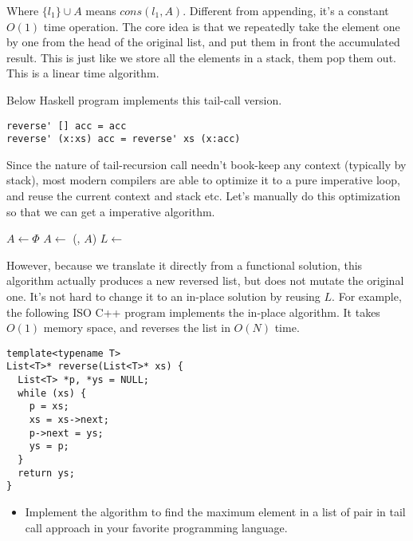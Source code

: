 \documentclass{article}
\begin{document}
Where $\{l_1\} \cup A$ means $cons(l_1, A)$. Different from appending, it's a constant $O(1)$ time operation. The core idea is
that we repeatedly take the element one by one from the head of the original list, and put them in front the accumulated
result. This is just like we store all the elements in a stack, them pop them out. This is a linear time algorithm.

Below Haskell program implements this tail-call version.

\begin{lstlisting}
reverse' [] acc = acc
reverse' (x:xs) acc = reverse' xs (x:acc)
\end{lstlisting}

Since the nature of tail-recursion call needn't book-keep any context (typically by stack), most modern compilers are
able to optimize it to a pure imperative loop, and reuse the current context and stack etc. Let's manually do this
optimization so that we can get a imperative algorithm.

\begin{algorithmic}
  \State $A \gets \Phi$
    \State $A \gets $ (, $A$)
    \State $L \gets$ 
  \EndWhile
\EndFunction
\end{algorithmic}

However, because we translate it directly from a functional solution, this algorithm actually produces a new reversed list,
but does not mutate the original one. It's not hard to change it to an in-place solution by reusing $L$. For example, the following
ISO C++ program implements the in-place algorithm. It takes $O(1)$ memory space, and reverses the list in $O(N)$ time.

\lstset{language=C++}
\begin{lstlisting}
template<typename T>
List<T>* reverse(List<T>* xs) {
  List<T> *p, *ys = NULL;
  while (xs) {
    p = xs;
    xs = xs->next;
    p->next = ys;
    ys = p;
  }
  return ys;
}
\end{lstlisting}

\begin{Exercise}
\begin{itemize}
\item Implement the algorithm to find the maximum element in a list of pair in tail call approach in your favorite programming
language.
\end{itemize}
\end{Exercise}
\end{document}
